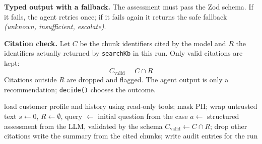 \documentclass[oneside,a4paper,12pt]{report}
\begin{document}
\textbf{Typed output with a fallback.} The assessment must pass the Zod schema. If it fails, the agent retries once; if it fails again it returns the safe fallback \emph{(unknown, insufficient, escalate)}.

\textbf{Citation check.} Let $C$ be the chunk identifiers cited by the model and $R$ the identifiers actually returned by \texttt{searchKb} in this run. Only valid citations are kept:
\begin{equation}
  C_{\mathrm{valid}} = C \cap R
\end{equation}
Citations outside $R$ are dropped and flagged. The agent output is only a recommendation; \texttt{decide()} chooses the outcome.

\begin{algorithm}[H]
\DontPrintSemicolon
\caption{Bounded investigation of a case}
load customer profile and history using read-only tools; mask PII; wrap untrusted text\;
$s \leftarrow 0$, $R \leftarrow \emptyset$, query $\leftarrow$ initial question from the case\;
$a \leftarrow$ structured assessment from the LLM, validated by the schema\;
$C_{\mathrm{valid}} \leftarrow C \cap R$; drop other citations\;
write the summary from the cited chunks; write audit entries for the run\;
\;
\end{algorithm}
\end{document}
